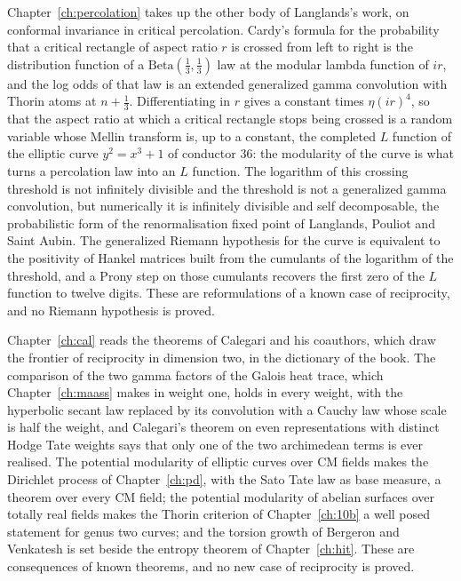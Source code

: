 Chapter~\ref{ch:percolation} takes up the other body of Langlands's work, on conformal invariance in critical percolation. Cardy's formula for the probability that a critical rectangle of aspect ratio $r$ is crossed from left to right is the distribution function of a $\mathrm{Beta}(\frac13,\frac13)$ law at the modular lambda function of $ir$, and the log odds of that law is an extended generalized gamma convolution with Thorin atoms at $n+\frac13$. Differentiating in $r$ gives a constant times $\eta(ir)^4$, so that the aspect ratio at which a critical rectangle stops being crossed is a random variable whose Mellin transform is, up to a constant, the completed $L$ function of the elliptic curve $y^2=x^3+1$ of conductor $36$: the modularity of the curve is what turns a percolation law into an $L$ function. The logarithm of this crossing threshold is not infinitely divisible and the threshold is not a generalized gamma convolution, but numerically it is infinitely divisible and self decomposable, the probabilistic form of the renormalisation fixed point of Langlands, Pouliot and Saint Aubin. The generalized Riemann hypothesis for the curve is equivalent to the positivity of Hankel matrices built from the cumulants of the logarithm of the threshold, and a Prony step on those cumulants recovers the first zero of the $L$ function to twelve digits. These are reformulations of a known case of reciprocity, and no Riemann hypothesis is proved.

Chapter~\ref{ch:cal} reads the theorems of Calegari and his coauthors, which draw the frontier of reciprocity in dimension two, in the dictionary of the book. The comparison of the two gamma factors of the Galois heat trace, which Chapter~\ref{ch:maass} makes in weight one, holds in every weight, with the hyperbolic secant law replaced by its convolution with a Cauchy law whose scale is half the weight, and Calegari's theorem on even representations with distinct Hodge Tate weights says that only one of the two archimedean terms is ever realised. The potential modularity of elliptic curves over CM fields makes the Dirichlet process of Chapter~\ref{ch:pd}, with the Sato Tate law as base measure, a theorem over every CM field; the potential modularity of abelian surfaces over totally real fields makes the Thorin criterion of Chapter~\ref{ch:10b} a well posed statement for genus two curves; and the torsion growth of Bergeron and Venkatesh is set beside the entropy theorem of Chapter~\ref{ch:hit}. These are consequences of known theorems, and no new case of reciprocity is proved.

